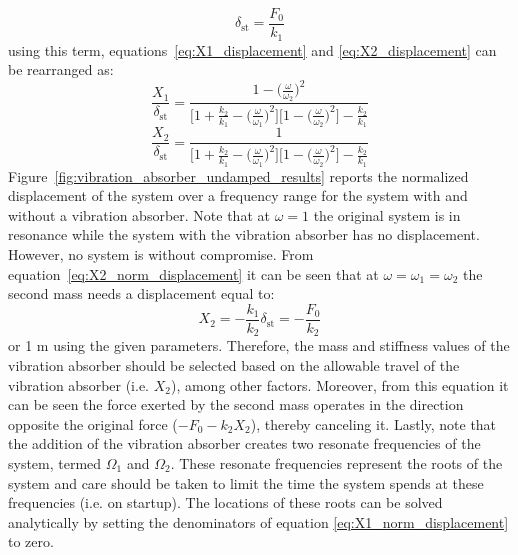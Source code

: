 \documentclass[12pt,letter]{article}
\begin{document}
\begin{equation}
\delta_{\text{st}} = \frac{F_0}{k_1}
\end{equation}
using this term, equations~\ref{eq:X1_displacement} and \ref{eq:X2_displacement} can be rearranged as:
\begin{equation}
\frac{X_1}{\delta_{\text{st}}} = \frac{1 - \big(\frac{\omega}{\omega_2} \big)^2 }{\Big[1 + \frac{k_2}{k_1} - \big(\frac{\omega}{\omega_1} \big)^2 \Big] \Big[ 1- \big(\frac{\omega}{\omega_2} \big)^2 \Big] -\frac{k_2}{k_1}}
\label{eq:X1_norm_displacement}
\end{equation}
\begin{equation}
\frac{X_2}{\delta_{\text{st}}} = \frac{1}{\Big[1 + \frac{k_2}{k_1} - \big(\frac{\omega}{\omega_1} \big)^2 \Big] \Big[ 1- \big(\frac{\omega}{\omega_2} \big)^2 \Big] -\frac{k_2}{k_1}}
\label{eq:X2_norm_displacement}
\end{equation}
Figure~\ref{fig:vibration_absorber_undamped_results} reports the normalized displacement of the system over a frequency range for the system with and without a vibration absorber. Note that at $\omega=1$ the original system is in resonance while the system with the vibration absorber has no displacement. However, no system is without compromise. From equation~\ref{eq:X2_norm_displacement} it can be seen that at $\omega = \omega_1 = \omega_2$ the second mass needs a displacement equal to:
\begin{equation}
X_2 = -\frac{k_1}{k_2}\delta_{\text{st}} = -\frac{F_0}{k_2}
\end{equation}
or 1 m using the given parameters. Therefore, the mass and stiffness values of the vibration absorber should be selected based on the allowable travel of the vibration absorber (i.e. $X_2$), among other factors. Moreover, from this equation it can be seen the force exerted by the second mass operates in the direction opposite the original force ($-F_0 - k_2 X_2$), thereby canceling it. Lastly, note that the addition of the vibration absorber creates two resonate frequencies of the system, termed $\Omega_1$ and $\Omega_2$. These resonate frequencies represent the roots of the system and care should be taken to limit the time the system spends at these frequencies (i.e. on startup). The locations of these roots can be solved analytically by setting the denominators of equation \ref{eq:X1_norm_displacement} to zero.

\end{document}
